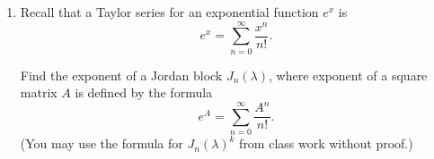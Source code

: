 \begin{enumerate}[1. ]
\begin{enumerate}[a) ]
\begin{enumerate}[(1)]
\item Is it diagonalisable as a real operator? (Hint: if it was, it would have two real eigenvectors. What would it mean for the geometric properties of the operator?)
\item Is it diagonalisable as a complex operator? Find its Jordan normal form. Explain how its complex Jordan normal form relates to its geometric properties.
\end{enumerate}
\end{enumerate}

\item Recall that a Taylor series for an exponential function $e^x$ is
$$
e^x = \sum_{n=0}^{\infty} \frac{x^n}{n!}.
$$

Find the exponent of a Jordan block $J_n(\lambda)$, where exponent of a square matrix $A$ is defined by the formula
$$
e^A = \sum_{n=0}^{\infty} \frac{A^n}{n!}.
$$
(You may use the formula for $J_n(\lambda)^k$ from class work without proof.)


\end{enumerate}